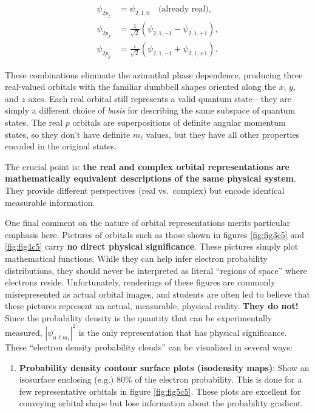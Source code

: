 \documentclass[
  english,
  9pt,
]{extbook}
\providecommand{\tightlist}{%
  \setlength{\itemsep}{0pt}\setlength{\parskip}{0pt}}
\theoremstyle{definition}
\theoremstyle{definition}
\theoremstyle{definition}
\theoremstyle{definition}
\theoremstyle{remark}
\begin{document}
\begin{equation}
\begin{aligned}
\psi_{2p_z} &= \psi_{2,1,0}\quad\text{(already real)},\\
\psi_{2p_x} &= \frac{1}{\sqrt{2}}\left(\psi_{2,1,-1} - \psi_{2,1,+1}\right),\\
\psi_{2p_y} &= \frac{i}{\sqrt{2}}\left(\psi_{2,1,-1} + \psi_{2,1,+1}\right).
\end{aligned}
\label{eq:HA9}
\end{equation}

These combinations eliminate the azimuthal phase dependence, producing three real-valued orbitals with the familiar dumbbell shapes oriented along the \(x\), \(y\), and \(z\) axes. Each real orbital still represents a valid quantum state---they are simply a different choice of \emph{basis} for describing the same subspace of quantum states. The real \(p\) orbitals are superpositions of definite angular momentum states, so they don't have definite \(m_\ell\) values, but they have all other properties encoded in the original states.

The crucial point is: \textbf{the real and complex orbital representations are mathematically equivalent descriptions of the same physical system}. They provide different perspectives (real vs.~complex) but encode identical measurable information.

One final comment on the nature of orbital representations merits particular emphasis here. Pictures of orbitals such as those shown in figures \ref{fig:fig3c5} and \ref{fig:fig4c5} carry \textbf{no direct physical significance}. These pictures simply plot mathematical functions. While they can help infer electron probability distributions, they should never be interpreted as literal ``regions of space'' where electrons reside. Unfortunately, renderings of these figures are commonly misrepresented as actual orbital images, and students are often led to believe that these pictures represent an actual, measurable, physical reality. \textbf{They do not!} Since the probability density is the quantity that can be experimentally measured, \(|\psi_{n\ell m_\ell}|^2\) is the only representation that has physical significance. These ``electron density probability clouds'' can be visualized in several ways:

\begin{enumerate}
\def\labelenumi{\arabic{enumi}.}
\tightlist
\item
  \textbf{Probability density contour surface plots (isodensity maps)}: Show an isosurface enclosing (e.g.) 80\% of the electron probability. This is done for a few representative orbitals in figure \ref{fig:fig5c5}. These plots are excellent for conveying orbital shape but lose information about the probability gradient.
\end{enumerate}
\end{document}
